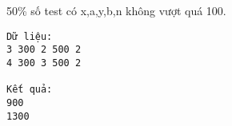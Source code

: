 50\% số test có x,a,y,b,n không vượt quá 100.
\begin{verbatim}
Dữ liệu:
3 300 2 500 2
4 300 3 500 2

Kết quả:
900
1300

\end{verbatim}